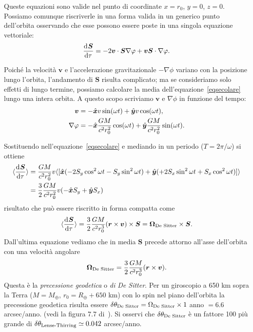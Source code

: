 Queste equazioni sono valide nel punto di coordinate $x=r_0$, $y=0$, $z=0$.
Possiamo comunque riscriverle in una forma valida in un generico punto
dell'orbita osservando che esse possono essere poste in una singola equazione
vettoriale:
 \begin{equation}
   \label{eqsecolare}
   \frac{{\mathop{}\!\mathrm{d}^{}}\bm{S}}{\mathop{}\!\mathrm{d} {\tau}^{}} = -2 \bm{v} \cdot \bm{S} \nabla \varphi + \bm{v}\bm{S}
   \cdot \nabla\varphi.
\end{equation}

Poiché la velocità $\bm{v}$ e l'accelerazione gravitazionale $-\nabla \phi$
variano con la posizione lungo l'orbita, l'andamento di $\bm S$ risulta
complicato; ma se consideriamo solo effetti di lungo termine, possiamo calcolare
la media dell'equazione~\eqref{eqsecolare} lungo una intera orbita.  A questo
scopo scriviamo $\bm{v}$ e $\nabla\phi$ in funzione del tempo:
\begin{subequations}
  \begin{align}
    \bm{v} &= -\hat{\bm{x}} v \sin(\omega t) + \hat{\bm{y}} v \cos(\omega t), \\
    \nabla\varphi &= -\hat{\bm{x}} \frac{GM}{c^2 r_0^2} \cos(\omega t) + \hat{\bm{y}}
                 \frac{GM}{c^2 r_0^2} \sin(\omega t).
  \end{align}
\end{subequations}

Sostituendo nell'equazione~\eqref{eqsecolare} e mediando in un periodo ($T=2
\pi/ \omega$) si ottiene
\begin{equation}
  \begin{split}
    \langle\frac{{\mathop{}\!\mathrm{d}^{}}\bm{S}}{\mathop{}\!\mathrm{d} {\tau}^{}}\rangle &= \frac{GM}{c^2 r_0^2} v \langle
    [\hat{\bm{x}} (-2 S_y \cos^2 \omega t - S_y \sin^2\omega t) +
    \hat{\bm{y}} ( +2 S_x \sin^2 \omega t + S_x \cos^2 \omega t) ]\rangle \\
    &= \frac{3}{2} \frac{GM}{c^2 r_0^2} v (-\hat{\bm{x}} S_y + \hat{\bm{y}} S_x)
  \end{split}
\end{equation}
risultato che può essere riscritto in forma compatta come
\begin{equation}
  \langle\frac{{\mathop{}\!\mathrm{d}^{}}\bm{S}}{\mathop{}\!\mathrm{d} {\tau}^{}}\rangle = \frac{3}{2} \frac{GM}{c^2 r_0^3} (\bm{r}
  \times \bm{v}) \times \bm{S} = \bm{\Omega}_{\textup{De Sitter}} \times
  \bm{S}.
\end{equation}
Dall'ultima equazione vediamo che in media $\bm{S}$ precede attorno all'asse
dell'orbita con una velocità angolare
\begin{equation}
  \bm{\Omega}_{\textup{De Sitter}} = \frac{3}{2} \frac{GM}{c^2 r_0^3} (\bm{r}
  \times \bm{v}).
\end{equation}
Questa è la \emph{precessione geodetica} o \emph{di De Sitter}.  Per un
giroscopio a 650 km sopra la Terra ($M=M_{\oplus}$, $r_0=R_{\oplus}+650$ km) con
lo spin nel piano dell'orbita la precessione geodetica risulta essere $\delta
\theta_{\textup{De Sitter}}= {\Omega_{\textup{De Sitter}}} \times 1$ anno $=
6.6$arcsec/anno.  (vedi la figura 7.7 di~\textcite[355]{ohanian:gravitazione}).
Si osservi che $\delta\theta_{\textup{De Sitter}}$ è un fattore 100 più grande
di $\delta\theta_{\textup{Lense-Thirring}} \simeq 0.042$ arcsec/anno.

